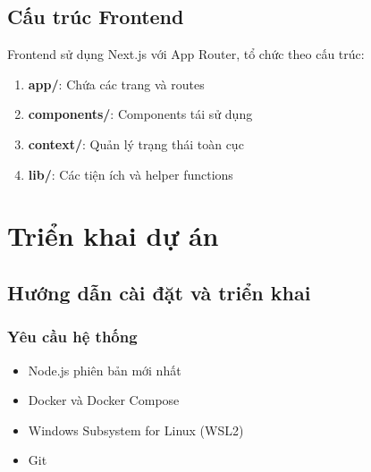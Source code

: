 \documentclass[a4paper]{article}
\begin{document}
\subsection{Cấu trúc Frontend}

Frontend sử dụng Next.js với App Router, tổ chức theo cấu trúc:

\begin{enumerate}
    \item \textbf{app/}: Chứa các trang và routes
    \item \textbf{components/}: Components tái sử dụng
    \item \textbf{context/}: Quản lý trạng thái toàn cục
    \item \textbf{lib/}: Các tiện ích và helper functions
\end{enumerate}
\newpage

 \section{Triển khai dự án}
    \subsection{Hướng dẫn cài đặt và triển khai}
        \subsubsection{Yêu cầu hệ thống}
        \begin{itemize}
             \item Node.js phiên bản mới nhất
            \item Docker và Docker Compose
            \item Windows Subsystem for Linux (WSL2)
            \item Git
        \end{itemize}
        
\end{document}

